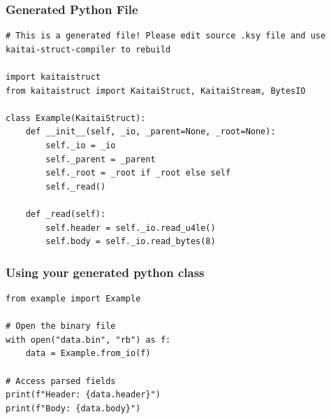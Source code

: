 \begin{frame}[fragile]
\frametitle{Generated Python File}


\begin{lstlisting}
# This is a generated file! Please edit source .ksy file and use kaitai-struct-compiler to rebuild

import kaitaistruct
from kaitaistruct import KaitaiStruct, KaitaiStream, BytesIO

class Example(KaitaiStruct):
    def __init__(self, _io, _parent=None, _root=None):
        self._io = _io
        self._parent = _parent
        self._root = _root if _root else self
        self._read()

    def _read(self):
        self.header = self._io.read_u4le()
        self.body = self._io.read_bytes(8)

\end{lstlisting}
\end{frame}


\begin{frame}[fragile]
\frametitle{Using your generated python class}

\begin{lstlisting}
from example import Example

# Open the binary file
with open("data.bin", "rb") as f:
    data = Example.from_io(f)

# Access parsed fields
print(f"Header: {data.header}")
print(f"Body: {data.body}")
\end{lstlisting}
\end{frame}

